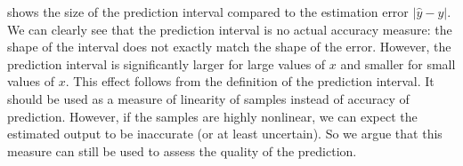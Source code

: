  shows the size of the prediction interval compared to the estimation error $\left| \hat{y} - y \right|$. We can clearly see that the prediction interval is no actual accuracy measure: the shape of the interval does not exactly match the shape of the error. However, the prediction interval is significantly larger for large values of $x$ and smaller for small values of $x$. This effect follows from the definition of the prediction interval. It should be used as a measure of linearity of samples instead of accuracy of prediction. However, if the samples are highly nonlinear, we can expect the estimated output to be inaccurate (or at least uncertain). So we argue that this measure can still be used to assess the quality of the prediction.

\begin{figure}[htbp]
	\centering
	\\
	\\
\end{figure}
